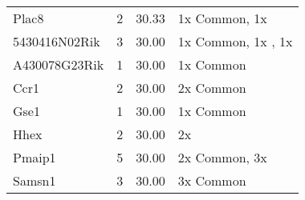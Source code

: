 {\begin{longtable}[l]{lccl}
Plac8	&  \num{2}	&  \num{ 30.33}	& 1x Common, 1x  \dnmtwtregular\\ 
5430416N02Rik	&  \num{3}	&  \num{ 30.00}	& 1x Common, 1x  \dnmtchipregular, 1x  \dnmtwtregular\\ 
A430078G23Rik	&  \num{1}	&  \num{ 30.00}	& 1x Common\\ 
Ccr1	&  \num{2}	&  \num{ 30.00}	& 2x Common\\ 
Gse1	&  \num{1}	&  \num{ 30.00}	& 1x Common\\ 
Hhex	&  \num{2}	&  \num{ 30.00}	& 2x  \dnmtchipregular\\ 
Pmaip1	&  \num{5}	&  \num{ 30.00}	& 2x Common, 3x  \dnmtwtregular\\ 
Samsn1	&  \num{3}	&  \num{ 30.00}	& 3x Common\\ 
		\end{longtable}
}

 \clearpage

